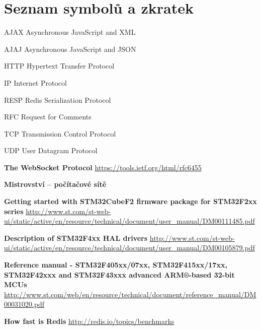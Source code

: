 \documentclass[oneside,12pt,a4paper,draft]{book} %
\makeatletter
\newcommand{\tocfill}{\cleaders\hbox{$\m@th \mkern\@dotsep mu . \mkern\@dotsep mu$}\hfill}
\newcommand{\abbrlabel}[1]{\makebox[\textwidth /2][l]{\textbf{#1}\ \tocfill}}
\newenvironment{abbreviations}{\begin{list}{}{\renewcommand{\makelabel}{\abbrlabel}%
        \setlength{\labelwidth}{\textwidth /2}\setlength{\leftmargin}{\labelwidth+\labelsep}%
                                              \setlength{\itemsep}{0pt}}}{\end{list}}
\makeatother
\begin{document}
\chapter*{Seznam symbolů a zkratek}
\noindent
\begin{abbreviations}
\item[AJAX]	Asynchronous JavaScript and XML
\item[AJAJ]	Asynchronous JavaScript and JSON
\item[HTTP]	Hypertext Transfer Protocol
\item[IP]	Internet Protocol
\item[RESP]	Redis Serialization Protocol
\item[RFC]	Request for Comments
\item[TCP]	Transmission Control Protocol
\item[UDP]	User Datagram Protocol
\end{abbreviations}












\begin{thebibliography}{9}
 {\bf The WebSocket Protocol} \url{https://tools.ietf.org/html/rfc6455}

 {\bf Mistrovství – počítačové sítě}

 {\bf Getting started with STM32CubeF2 firmware package for STM32F2xx series} \url{http://www.st.com/st-web-ui/static/active/en/resource/technical/document/user_manual/DM00111485.pdf}

 {\bf Description of STM32F4xx HAL drivers} \url{http://www.st.com/st-web-ui/static/active/en/resource/technical/document/user_manual/DM00105879.pdf}

 {\bf Reference manual - STM32F405xx/07xx, STM32F415xx/17xx, STM32F42xxx and
STM32F43xxx advanced ARM®-based 32-bit MCUs} \url{http://www.st.com/web/en/resource/technical/document/reference_manual/DM00031020.pdf}

 {\bf How fast is Redis} \url{http://redis.io/topics/benchmarks}
\end{thebibliography}
\end{document}
